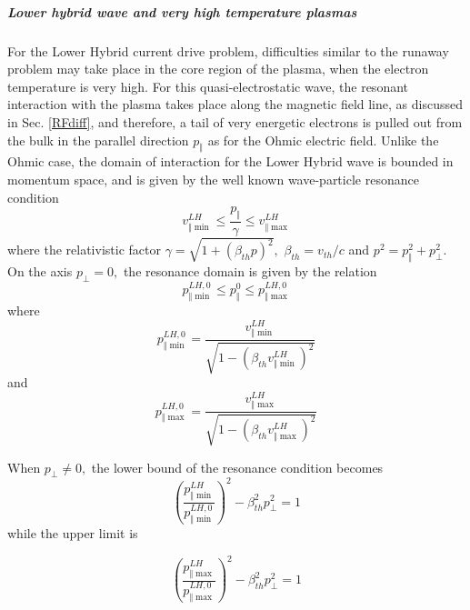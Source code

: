 \subparagraph{Lower hybrid wave and very high temperature
plasmas}\label{boundarylhsec}

For the Lower Hybrid current drive problem, difficulties similar to the
runaway problem may take place in the core region of the plasma, when the
electron temperature is very high. For this quasi-electrostatic wave, the
resonant interaction with the plasma takes place along the magnetic field
line, as discussed in Sec. \ref{RFdiff}, and therefore, a tail of very
energetic electrons is pulled out from the bulk in the parallel direction $%
p_{\Vert }$ as for the Ohmic electric field. Unlike the Ohmic case, the
domain of interaction for the Lower Hybrid wave is bounded in momentum
space, and is given by the well known wave-particle resonance condition
\begin{equation}
v_{\Vert \min }^{LH}\leq \frac{p_{\Vert }}{\gamma }\leq v_{\Vert \max }^{LH}
\end{equation}
where the relativistic factor $\gamma =\sqrt{1+\left( \beta _{th}p\right)
^{2}},$ $\beta _{th}=v_{th}/c$ and $p^{2}=p_{\Vert }^{2}+p_{\bot }^{2}.$ On
the axis $p_{\bot }=0,$ the resonance domain is given by the relation
\begin{equation}
p_{\Vert \min }^{LH,0}\leq p_{\Vert }^{0}\leq p_{\Vert \max }^{LH,0}
\end{equation}
where
\begin{equation}
p_{\Vert \min }^{LH,0}=\frac{v_{\Vert \min }^{LH}}{\sqrt{1-\left( \beta
_{th}v_{\Vert \min }^{LH}\right) ^{2}}}
\end{equation}
and
\begin{equation}
p_{\Vert \max }^{LH,0}=\frac{v_{\Vert \max }^{LH}}{\sqrt{1-\left( \beta
_{th}v_{\Vert \max }^{LH}\right) ^{2}}}
\end{equation}

When $p_{\bot }\neq 0,$ the lower bound of the resonance condition becomes
\begin{equation}
\left( \frac{p_{\Vert \min }^{LH}}{p_{\Vert \min }^{LH,0}}\right) ^{2}-\beta
_{th}^{2}p_{\bot }^{2}=1
\end{equation}
while the upper limit is

\begin{equation}
\left( \frac{p_{\Vert \max }^{LH}}{p_{\Vert \max }^{LH,0}}\right) ^{2}-\beta
_{th}^{2}p_{\bot }^{2}=1
\end{equation}

